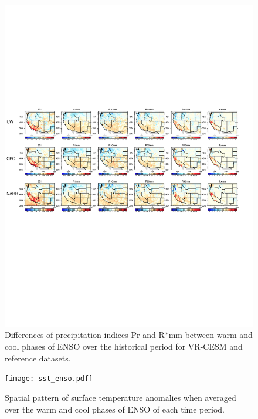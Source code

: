 \documentclass{ametsoc}
\begin{document}
\begin{figure}
\begin{center}
\includegraphics[width=6in]{wd_index_enso_ref_wetSeason.pdf}
\caption{Differences of precipitation indices Pr and R$\ast$mm between warm and cool phases of ENSO over the historical period for VR-CESM and reference datasets.}
\end{center}
\label{fig:S4}
\end{figure}


\begin{figure}
\begin{center}
\texttt{[image: sst\_enso.pdf]}
\caption{Spatial pattern of surface temperature anomalies when averaged over the warm and cool phases of ENSO of each time period.}
\end{center}
\label{fig:S5}
\end{figure}

\end{document}
